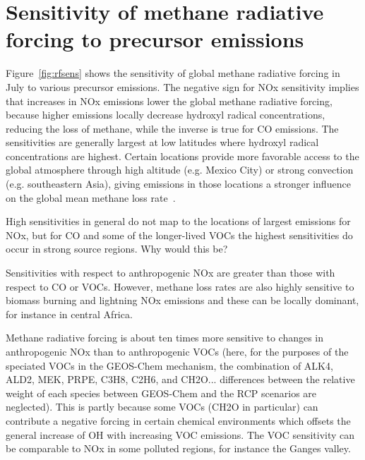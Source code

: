 \section{Sensitivity of methane radiative forcing to precursor emissions}

Figure~\ref{fig:rfsens} shows the sensitivity of global methane radiative forcing in July to various precursor emissions. The negative sign for NOx sensitivity implies that increases in NOx emissions lower the global methane radiative forcing, because higher emissions locally decrease hydroxyl radical concentrations, reducing the loss of methane, while the inverse is true for CO emissions. The sensitivities are generally largest at low latitudes where hydroxyl radical concentrations are highest. Certain locations provide more favorable access to the global atmosphere through high altitude (e.g. Mexico City) or strong convection (e.g. southeastern Asia), giving emissions in those locations a stronger influence on the global mean methane loss rate~\citep{ref:bowman2012}.

High sensitivities in general do not map to the locations of largest emissions for NOx, but for CO and some of the longer-lived VOCs the highest sensitivities do occur in strong source regions. Why would this be?

Sensitivities with respect to anthropogenic NOx are greater than those with respect to CO or VOCs. However, methane loss rates are also highly sensitive to biomass burning and lightning NOx emissions and these can be locally dominant, for instance in central Africa.

Methane radiative forcing is about ten times more sensitive to changes in anthropogenic NOx than to anthropogenic VOCs (here, for the purposes of the speciated VOCs in the GEOS-Chem mechanism, the combination of ALK4, ALD2, MEK, PRPE, C3H8, C2H6, and CH2O... differences between the relative weight of each species between GEOS-Chem and the RCP scenarios are neglected). This is partly because some VOCs (CH2O in particular) can contribute a negative forcing in certain chemical environments which offsets the general increase of OH with increasing VOC emissions. The VOC sensitivity can be comparable to NOx in some polluted regions, for instance the Ganges valley.

